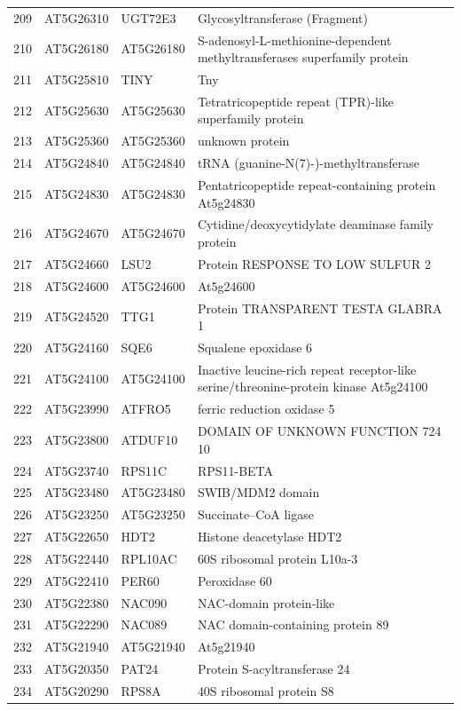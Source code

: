 \documentclass[11pt]{article}
\begin{document}
\begin{center}
\begin{tabular}{rlll}
209 & AT5G26310 & UGT72E3 & Glycosyltransferase (Fragment)\\
210 & AT5G26180 & AT5G26180 & S-adenosyl-L-methionine-dependent methyltransferases superfamily protein\\
211 & AT5G25810 & TINY & Tny\\
212 & AT5G25630 & AT5G25630 & Tetratricopeptide repeat (TPR)-like superfamily protein\\
213 & AT5G25360 & AT5G25360 & unknown protein\\
214 & AT5G24840 & AT5G24840 & tRNA (guanine-N(7)-)-methyltransferase\\
215 & AT5G24830 & AT5G24830 & Pentatricopeptide repeat-containing protein At5g24830\\
216 & AT5G24670 & AT5G24670 & Cytidine/deoxycytidylate deaminase family protein\\
217 & AT5G24660 & LSU2 & Protein RESPONSE TO LOW SULFUR 2\\
218 & AT5G24600 & AT5G24600 & At5g24600\\
219 & AT5G24520 & TTG1 & Protein TRANSPARENT TESTA GLABRA 1\\
220 & AT5G24160 & SQE6 & Squalene epoxidase 6\\
221 & AT5G24100 & AT5G24100 & Inactive leucine-rich repeat receptor-like serine/threonine-protein kinase At5g24100\\
222 & AT5G23990 & ATFRO5 & ferric reduction oxidase 5\\
223 & AT5G23800 & ATDUF10 & DOMAIN OF UNKNOWN FUNCTION 724 10\\
224 & AT5G23740 & RPS11C & RPS11-BETA\\
225 & AT5G23480 & AT5G23480 & SWIB/MDM2 domain\\
226 & AT5G23250 & AT5G23250 & Succinate--CoA ligase\\
227 & AT5G22650 & HDT2 & Histone deacetylase HDT2\\
228 & AT5G22440 & RPL10AC & 60S ribosomal protein L10a-3\\
229 & AT5G22410 & PER60 & Peroxidase 60\\
230 & AT5G22380 & NAC090 & NAC-domain protein-like\\
231 & AT5G22290 & NAC089 & NAC domain-containing protein 89\\
232 & AT5G21940 & AT5G21940 & At5g21940\\
233 & AT5G20350 & PAT24 & Protein S-acyltransferase 24\\
234 & AT5G20290 & RPS8A & 40S ribosomal protein S8\\

\end{tabular}
\end{center}
\end{document}
